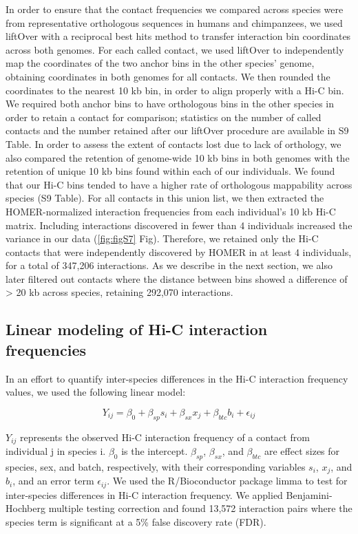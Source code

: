 In order to ensure that the contact frequencies we compared across species were from representative orthologous sequences in humans and chimpanzees, we used liftOver with a reciprocal best hits method \cite{Ward.2014, Kent.2002} to transfer interaction bin coordinates across both genomes. For each called contact, we used liftOver to independently map the coordinates of the two anchor bins in the other species' genome, obtaining coordinates in both genomes for all contacts. We then rounded the coordinates to the nearest 10 kb bin, in order to align properly with a Hi-C bin. We required both anchor bins to have orthologous bins in the other species in order to retain a contact for comparison; statistics on the number of called contacts and the number retained after our liftOver procedure are available in S9 Table. In order to assess the extent of contacts lost due to lack of orthology, we also compared the retention of genome-wide 10 kb bins in both genomes with the retention of unique 10 kb bins found within each of our individuals. We found that our Hi-C bins tended to have a higher rate of orthologous mappability across species (S9 Table). For all contacts in this union list, we then extracted the HOMER-normalized interaction frequencies from each individual's 10 kb Hi-C matrix. Including interactions discovered in fewer than 4 individuals increased the variance in our data (\ref{fig:figS7} Fig). Therefore, we retained only the Hi-C contacts that were independently discovered by HOMER in at least 4 individuals, for a total of 347,206 interactions. As we describe in the next section, we also later filtered out contacts where the distance between bins showed a difference of {\textgreater} 20 kb across species, retaining 292,070 interactions.

\subsection{Linear modeling of Hi-C interaction frequencies}

In an effort to quantify inter-species differences in the Hi-C interaction frequency values, we used the following linear model:

\begin{equation} \label{eq:limma}
Y_{ij} = \beta_{0} + \beta_{sp}s_{i} + \beta_{sx}x_{j} + \beta_{btc}b_{i} + \epsilon_{ij}
\end{equation}

$Y_{ij}$ represents the observed Hi-C interaction frequency of a contact from individual j in species i. $\beta_{0}$ is the intercept. $\beta_{sp}$, $\beta_{sx}$, and $\beta_{btc}$ are effect sizes for species, sex, and batch, respectively, with their corresponding variables $s_{i}$, $x_{j}$, and $b_{i}$, and an error term $\epsilon_{ij}$. We used the R/Bioconductor package limma \cite{Smyth.2004, Law.2014} to test for inter-species differences in Hi-C interaction frequency. We applied Benjamini-Hochberg multiple testing correction and found 13,572 interaction pairs where the species term is significant at a 5\% false discovery rate (FDR).

